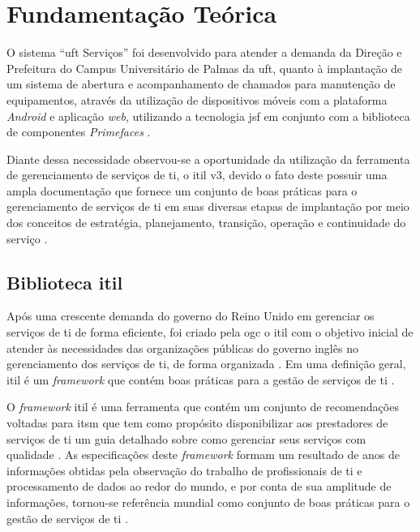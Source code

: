 \chapter{Fundamentação Teórica}

\noindent O sistema ``\acrshort{uft} Serviços'' foi desenvolvido para atender a demanda da Direção e Prefeitura do Campus Universitário de Palmas da \acrshort{uft}, quanto à implantação de um sistema de abertura e acompanhamento de chamados para manutenção de equipamentos, através da utilização de dispositivos móveis com a plataforma \textit{Android} \cite{android} e aplicação \textit{web}, utilizando a tecnologia \gls{jsf} \cite{jsf} em conjunto com a biblioteca de componentes \textit{Primefaces} \cite{primefaces}.

Diante dessa necessidade observou-se a oportunidade da utilização da ferramenta de gerenciamento de serviços de \acrshort{ti}, o \acrshort{itil} v3, devido o fato deste possuir uma ampla documentação que fornece um conjunto de boas práticas para o gerenciamento de serviços de \acrshort{ti} em suas diversas etapas de implantação  por meio dos conceitos de estratégia, planejamento, transição, operação e continuidade do serviço \cite{servicestrategy, introductoryoverviewofitil}.

\section{Biblioteca \acrshort{itil}}

\noindent Após uma crescente demanda do governo do Reino Unido em gerenciar os serviços de \acrshort{ti} de forma eficiente, foi criado pela \gls{ogc} o \acrshort{itil} com o objetivo inicial de atender às necessidades das organizações públicas do governo inglês no gerenciamento dos serviços de \acrshort{ti}, de forma organizada \cite{itilservicemanagement}.
Em uma definição geral, \acrshort{itil} é um \textit{framework} que contém boas práticas para a gestão de serviços de \acrshort{ti} \cite{abreu2012implantando, servicestrategy, introductoryoverviewofitil}.


O \textit{framework} \acrshort{itil} é uma ferramenta que contém um conjunto de recomendações voltadas para \gls{itsm} que tem como propósito disponibilizar aos prestadores de serviços de \acrshort{ti} um guia detalhado sobre  como gerenciar seus serviços com qualidade \cite{servicestrategy}. As especificações deste \textit{framework} formam um resultado de anos de informações obtidas pela observação do trabalho de profissionais de \acrshort{ti} e processamento de dados ao redor do mundo, e por conta de sua amplitude de informações, tornou-se referência mundial como conjunto de boas práticas para o gestão de serviços de \acrshort{ti} \cite{abreu2012implantando}.


